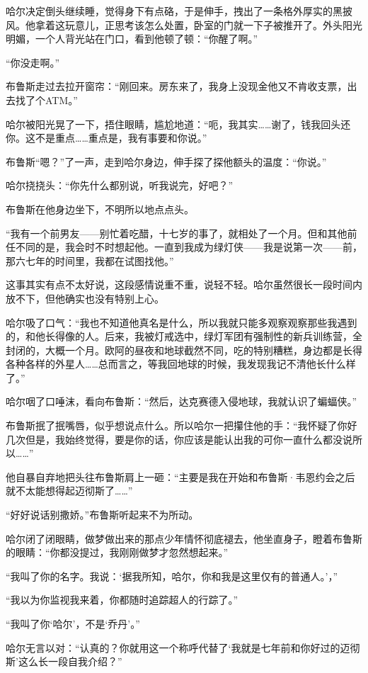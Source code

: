 \documentclass[../main]{subfiles}
\begin{document}
哈尔决定倒头继续睡，觉得身下有点硌，于是伸手，拽出了一条格外厚实的黑披风。他拿着这玩意儿，正思考该怎么处置，卧室的门就一下子被推开了。外头阳光明媚，一个人背光站在门口，看到他顿了顿：“你醒了啊。”

“你没走啊。”

布鲁斯走过去拉开窗帘：“刚回来。房东来了，我身上没现金他又不肯收支票，出去找了个ATM。”

哈尔被阳光晃了一下，捂住眼睛，尴尬地道：“呃，我其实……谢了，钱我回头还你。这不是重点……重点是，我有事要和你说。”

布鲁斯“嗯？”了一声，走到哈尔身边，伸手探了探他额头的温度：“你说。”

哈尔挠挠头：“你先什么都别说，听我说完，好吧？”

布鲁斯在他身边坐下，不明所以地点点头。

“我有一个前男友——别忙着吃醋，十七岁的事了，就相处了一个月。但和其他前任不同的是，我会时不时想起他。一直到我成为绿灯侠——我是说第一次——前，那六七年的时间里，我都在试图找他。”

这事其实有点不太好说，这段感情说重不重，说轻不轻。哈尔虽然很长一段时间内放不下，但他确实也没有特别上心。

哈尔吸了口气：“我也不知道他真名是什么，所以我就只能多观察观察那些我遇到的，和他长得像的人。后来，我被灯戒选中，绿灯军团有强制性的新兵训练营，全封闭的，大概一个月。欧阿的昼夜和地球截然不同，吃的特别糟糕，身边都是长得各种各样的外星人……总而言之，等我回地球的时候，我发现我记不清他长什么样了。”

哈尔咽了口唾沫，看向布鲁斯：“然后，达克赛德入侵地球，我就认识了蝙蝠侠。”

布鲁斯抿了抿嘴唇，似乎想说点什么。所以哈尔一把攥住他的手：“我怀疑了你好几次但是，我始终觉得，要是你的话，你应该是能认出我的可你一直什么都没说所以\ldots\ldots”

他自暴自弃地把头往布鲁斯肩上一砸：“主要是我在开始和布鲁斯·韦恩约会之后就不太能想得起迈彻斯了\ldots\ldots”

“好好说话别撒娇。”布鲁斯听起来不为所动。

哈尔闭了闭眼睛，做梦做出来的那点少年情怀彻底褪去，他坐直身子，瞪着布鲁斯的眼睛：“你都没提过，我刚刚做梦才忽然想起来。”

“我叫了你的名字。我说：`据我所知，哈尔，你和我是这里仅有的普通人。'，”

“我以为你监视我来着，你都随时追踪超人的行踪了。”

“我叫了你`哈尔'，不是`乔丹'。”

哈尔无言以对：“认真的？你就用这一个称呼代替了`我就是七年前和你好过的迈彻斯'这么长一段自我介绍？”
\end{document}

